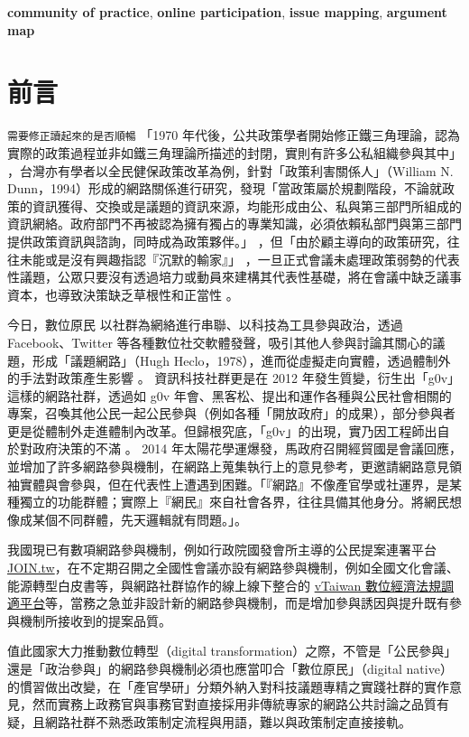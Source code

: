 \documentclass[12pt,a4paper]{article}
\begin{document}
\textbf{community of practice}, \textbf{online participation}, \textbf{issue mapping}, \textbf{argument map}
\section{前言}
\label{sec:org4c73e70}
\texttt{需要修正讀起來的是否順暢}
「1970 年代後，公共政策學者開始修正鐵三角理論，認為實際的政策過程並非如鐵三角理論所描述的封閉，實則有許多公私組織參與其中」 \citep*{luo15_gong} ，台灣亦有學者以全民健保政策改革為例，針對「政策利害關係人」（William N. Dunn，1994）形成的網路關係進行研究，發現「當政策屬於規劃階段，不論就政策的資訊獲得、交換或是議題的資訊來源，均能形成由公、私與第三部門所組成的資訊網絡。政府部門不再被認為擁有獨占的專業知識，必須依賴私部門與第三部門提供政策資訊與諮詢，同時成為政策夥伴。」\citep{luo2005} ，但「由於顧主導向的政策研究，往往未能或是沒有興趣指認『沉默的輸家』」\citep*{chen11} ，一旦正式會議未處理政策弱勢的代表性議題，公眾只要沒有透過培力或動員來建構其代表性基礎，將在會議中缺乏議事資本，也導致決策缺乏草根性和正當性 \citep*{lo17}。

今日，數位原民 \citep*{prensky2001digital} 以社群為網絡進行串聯、以科技為工具參與政治，透過 Facebook、Twitter 等各種數位社交軟體發聲，吸引其他人參與討論其關心的議題，形成「議題網路」（Hugh Heclo，1978），進而從虛擬走向實體，透過體制外的手法對政策產生影響 \citep*{xue11_xiang} 。 資訊科技社群更是在 2012 年發生質變，衍生出「g0v」這樣的網路社群，透過如 g0v 年會、黑客松、提出和運作各種與公民社會相關的專案，召喚其他公民一起公民參與（例如各種「開放政府」的成果），部分參與者更是從體制外走進體制內改革。但歸根究底，「g0v」的出現，實乃因工程師出自於對政府決策的不滿 \citep*{zheng18} 。 2014 年太陽花學運爆發，馬政府召開經貿國是會議回應，並增加了許多網路參與機制，在網路上蒐集執行上的意見參考，更邀請網路意見領袖實體與會參與，但在代表性上遭遇到困難。「『網路』不像產官學或社運界，是某種獨立的功能群體；實際上『網民』來自社會各界，往往具備其他身分。將網民想像成某個不同群體，先天邏輯就有問題。」\citep*{albert2014}。

我國現已有數項網路參與機制，例如行政院國發會所主導的公民提案連署平台 \href{https://join.gov.tw}{JOIN.tw}，在不定期召開之全國性會議亦設有網路參與機制，例如全國文化會議、能源轉型白皮書等，與網路社群協作的線上線下整合的 \href{https://vtaiwan.tw/}{vTaiwan 數位經濟法規調適平台}等，當務之急並非設計新的網路參與機制，而是增加參與誘因與提升既有參與機制所接收到的提案品質。

值此國家大力推動數位轉型（digital transformation）之際，不管是「公民參與」還是「政治參與」的網路參與機制必須也應當叩合「數位原民」（digital native）的慣習做出改變，在「產官學研」分類外納入對科技議題專精之實踐社群的實作意見，然而實務上政務官與事務官對直接採用非傳統專家的網路公共討論之品質有疑，且網路社群不熟悉政策制定流程與用語，難以與政策制定直接接軌。
\end{document}

